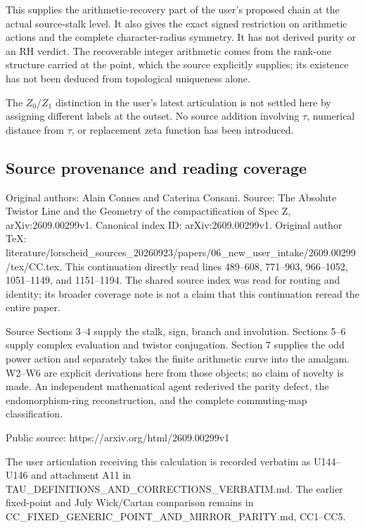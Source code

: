 \documentclass[
  11pt,
]{article}
\begin{document}
This supplies the arithmetic-recovery part of the user's proposed chain
at the actual source-stalk level. It also gives the exact signed
restriction on arithmetic actions and the complete character-radius
symmetry. It has not derived purity or an RH verdict. The recoverable
integer arithmetic comes from the rank-one structure carried at the
point, which the source explicitly supplies; its existence has not been
deduced from topological uniqueness alone.

The \(Z_0/Z_1\) distinction in the user's latest articulation is not
settled here by assigning different labels at the outset. No source
addition involving \(\tau\), numerical distance from \(\tau\), or
replacement zeta function has been introduced.

\subsection{Source provenance and reading
coverage}\label{source-provenance-and-reading-coverage}

Original authors: Alain Connes and Caterina Consani. Source: The
Absolute Twistor Line and the Geometry of the compactification of Spec
Z, arXiv:2609.00299v1. Canonical index ID: arXiv:2609.00299v1. Original
author TeX:
literature/lorscheid\_sources\_20260923/papers/06\_new\_user\_intake/2609.00299/tex/CC.tex.
This continuation directly read lines 489--608, 771--903, 966--1052,
1051--1149, and 1151--1194. The shared source index was read for routing
and identity; its broader coverage note is not a claim that this
continuation reread the entire paper.

Source Sections 3--4 supply the stalk, sign, branch and involution.
Sections 5--6 supply complex evaluation and twistor conjugation. Section
7 supplies the odd power action and separately takes the finite
arithmetic curve into the amalgam. W2--W6 are explicit derivations here
from those objects; no claim of novelty is made. An independent
mathematical agent rederived the parity defect, the endomorphism-ring
reconstruction, and the complete commuting-map classification.

Public source: https://arxiv.org/html/2609.00299v1

The user articulation receiving this calculation is recorded verbatim as
U144--U146 and attachment A11 in
TAU\_DEFINITIONS\_AND\_CORRECTIONS\_VERBATIM.md. The earlier fixed-point
and July Wick/Cartan comparison remains in
CC\_FIXED\_GENERIC\_POINT\_AND\_MIRROR\_PARITY.md, CC1--CC5.
\end{document}
